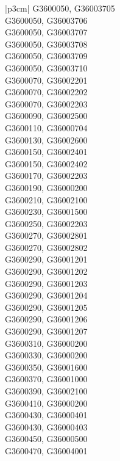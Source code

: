 \begin{customLongTable}{ |p{3cm}| }
G3600050, G36003705 \\ \hline
G3600050, G36003706 \\ \hline
G3600050, G36003707 \\ \hline
G3600050, G36003708 \\ \hline
G3600050, G36003709 \\ \hline
G3600050, G36003710 \\ \hline
G3600070, G36002201 \\ \hline
G3600070, G36002202 \\ \hline
G3600070, G36002203 \\ \hline
G3600090, G36002500 \\ \hline
G3600110, G36000704 \\ \hline
G3600130, G36002600 \\ \hline
G3600150, G36002401 \\ \hline
G3600150, G36002402 \\ \hline
G3600170, G36002203 \\ \hline
G3600190, G36000200 \\ \hline
G3600210, G36002100 \\ \hline
G3600230, G36001500 \\ \hline
G3600250, G36002203 \\ \hline
G3600270, G36002801 \\ \hline
G3600270, G36002802 \\ \hline
G3600290, G36001201 \\ \hline
G3600290, G36001202 \\ \hline
G3600290, G36001203 \\ \hline
G3600290, G36001204 \\ \hline
G3600290, G36001205 \\ \hline
G3600290, G36001206 \\ \hline
G3600290, G36001207 \\ \hline
G3600310, G36000200 \\ \hline
G3600330, G36000200 \\ \hline
G3600350, G36001600 \\ \hline
G3600370, G36001000 \\ \hline
G3600390, G36002100 \\ \hline
G3600410, G36000200 \\ \hline
G3600430, G36000401 \\ \hline
G3600430, G36000403 \\ \hline
G3600450, G36000500 \\ \hline
G3600470, G36004001 \\ \hline

\end{customLongTable}
